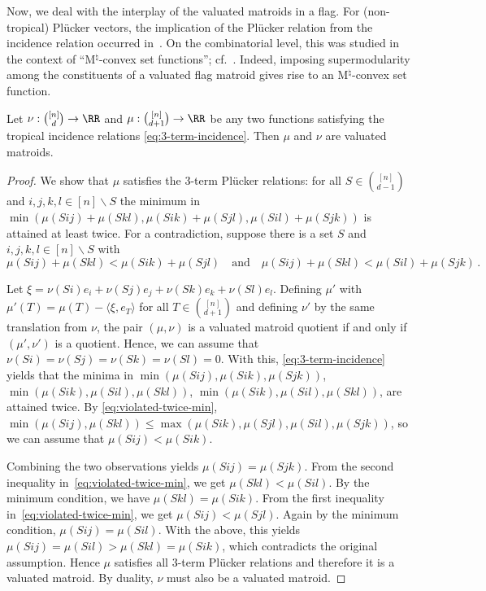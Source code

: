 Now, we deal with the interplay of the valuated matroids in a flag.
For (non-tropical) Pl\"ucker vectors, the implication of the Pl\"ucker relation from the incidence relation occurred in~\cite{JellMarkwigRinconSchroter:2003.02660}.
On the combinatorial level, this was studied in the context of \enquote{M$^{\natural}$-convex set functions}; cf.\ \cite{MurotaShioura:2018}.
Indeed, imposing supermodularity among the constituents of a valuated flag matroid gives rise to an M$^{\natural}$-convex set function. 

\begin{theorem} 
  \label{thm:1step}
  Let $\nu : \binom{[n]}{d} \to \RR$ and $\mu : \binom{[n]}{d+1} \to \RR$ be any two functions satisfying the tropical incidence relations \eqref{eq:3-term-incidence}. 
  Then $\mu$ and $\nu$ are valuated matroids.
\end{theorem}
\begin{proof}
	We show that $\mu$ satisfies the 3-term Pl\"ucker relations: for all $S\in\binom{[n]}{d-1}$ and $i,j,k,l \in [n]\backslash S$ the minimum in $\min(\mu(Sij) + \mu(Skl),\mu(Sik) + \mu(Sjl),\mu(Sil) + \mu(Sjk))$
	is attained at least twice.
	For a contradiction, suppose there is a set $S$ and $i,j,k,l \in [n]\backslash S$ with
	\begin{equation} \label{eq:violated-twice-min}
		\mu(Sij) + \mu(Skl) < \mu(Sik) + \mu(Sjl) \quad \text{and} \quad \mu(Sij) + \mu(Skl) < \mu(Sil) + \mu(Sjk) \, .
	\end{equation}
	
	Let $\xi = \nu(Si) e_i + \nu(Sj) e_j + \nu(Sk) e_k + \nu(Sl) e_l$.
	Defining $\mu'$ with $\mu'(T) = \mu(T) - \langle\xi,e_T\rangle$ for all $T \in \binom{[n]}{d+1}$ and defining $\nu'$ by the same translation from $\nu$, the pair $(\mu,\nu)$ is a valuated matroid quotient if and only if $(\mu',\nu')$ is a quotient.
	Hence, we can assume that $\nu(Si) = \nu(Sj) =\nu(Sk) = \nu(Sl) = 0$. 
	With this, \eqref{eq:3-term-incidence} yields that the minima in $\min(\mu(Sij),\mu(Sik),\mu(Sjk))$, $\min(\mu(Sik),\mu(Sil),\mu(Skl))$, $\min(\mu(Sik),\mu(Sil),\mu(Skl))$, are attained twice.
	 By \eqref{eq:violated-twice-min}, $\min(\mu(Sij),\mu(Skl)) \leq \max(\mu(Sik),\mu(Sjl),\mu(Sil),\mu(Sjk))$, so we can assume that $\mu(Sij) < \mu(Sik)$.
	
	Combining the two observations yields $\mu(Sij) = \mu(Sjk)$.
	From the second inequality in~\eqref{eq:violated-twice-min}, we get $\mu(Skl) < \mu(Sil)$.
	By the minimum condition, we have $\mu(Skl) = \mu(Sik)$. 
	From the first inequality in~\eqref{eq:violated-twice-min}, we get $\mu(Sij) < \mu(Sjl)$.
	Again by the minimum condition, $\mu(Sij) = \mu(Sil)$. 
	With the above, this yields $\mu(Sij) = \mu(Sil) > \mu(Skl) = \mu(Sik)$, which contradicts the original assumption. 
	Hence $\mu$ satisfies all 3-term Pl\"ucker relations and therefore it is a valuated matroid.
	By duality, $\nu$ must also be a valuated matroid.
\end{proof}


